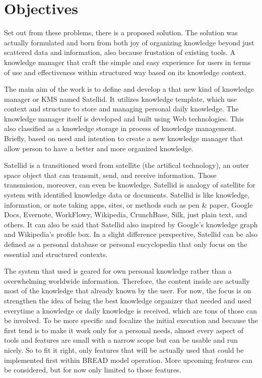 \section{Objectives}
\label{sec:objectives}

Set out from these problems, there is a proposed solution.
The solution was actually formulated and born from both joy of organizing knowledge beyond just scattered data and information, also because frustation of existing tools.
A knowledge manager that craft the simple and easy experience for users in terms of use and effectiveness within structured way based on its knowledge context.

The main aim of the work is to define and develop a that new kind of knowledge manager or \ac{KMS} named Satellid.
It utilizes knowledge template, which use context and structure to store and managing personal daily knowledge.
The knowledge manager itself is developed and built using Web technologies.
This also classified as a knowledge storage in process of knowledge management.
Briefly, based on need and intention to create a new knowledge manager that allow person to have a better and more organized knowledge.

Satellid is a transitioned word from satellite (the artifical technology), an outer space object that can transmit, send, and receive information.
Those transmission, moreover, can even be knowledge.
Satellid is analogy of satellite for system with identified knowledge data or documents.
Satellid is like knowledge, information, or note taking apps, sites, or methods such as pen \& paper, Google Docs, Evernote, WorkFlowy, Wikipedia, CrunchBase, Silk, just plain text, and others.
It can also be said that Satellid also inspired by Google's knowledge graph and Wikipedia's profile box.
In a slight difference perspective, Satellid can be also defined as a personal database or personal encyclopedia that only focus on the essential and structured contexts.

The system that used is geared for own personal knowledge rather than a overwhelming worldwide information.
Therefore, the content inside are actually most of the knowledge that already known by the user.
For now, the focus is on strengthen the idea of being the best knowledge organizer that needed and used everytime a knowledge or daily knowledge is received, which are tons of those can be involved.
To be more specific and focalize the initial execution and because the first tend is to make it work only for a personal needs, almost every aspect of tools and features are small with a narrow scope but can be usable and run nicely.
So to fit it right, only features that will be actually used that could be implemented first within \ac{BREAD} model operation.
More upcoming features can be considered, but for now only limited to those features.

